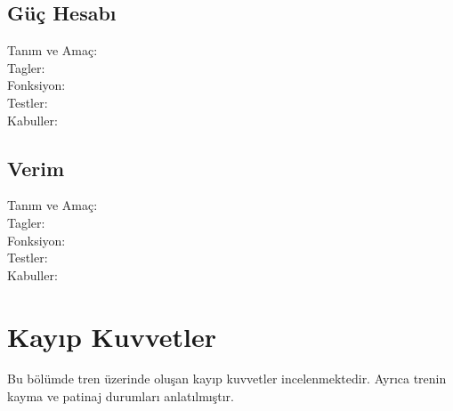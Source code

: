 \documentclass[10pt,a4paper]{article}
\begin{document}
\subsection{Güç Hesabı}
\begin{description}
\item[Tanım ve Amaç:] 
\item[Tagler:]
\item[Fonksiyon:]
\item[Testler:]
\item[Kabuller:]
\end{description}
\newpage

\subsection{Verim}
\begin{description}
\item[Tanım ve Amaç:] 
\item[Tagler:]
\item[Fonksiyon:]
\item[Testler:]
\item[Kabuller:]
\end{description}
\newpage

\newpage
\section{Kayıp Kuvvetler}
Bu bölümde tren üzerinde oluşan kayıp kuvvetler incelenmektedir. Ayrıca trenin kayma ve patinaj durumları anlatılmıştır.
\end{document}
